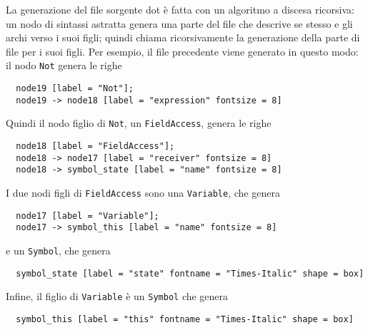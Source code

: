 La generazione del file sorgente dot \`e fatta con un algoritmo
a discesa ricorsiva:
un nodo di sintassi astratta genera una parte del file
che descrive se stesso e gli archi verso i suoi figli; quindi chiama
ricorsivamente la generazione della parte di file per i suoi figli.
Per esempio, il file precedente viene generato in questo modo:
il nodo \texttt{Not} genera le righe
%
\begin{verbatim}
  node19 [label = "Not"];
  node19 -> node18 [label = "expression" fontsize = 8]
\end{verbatim}
%
Quindi il nodo figlio di \texttt{Not}, \cioe un \texttt{FieldAccess},
genera le righe
%
\begin{verbatim}
  node18 [label = "FieldAccess"];
  node18 -> node17 [label = "receiver" fontsize = 8]
  node18 -> symbol_state [label = "name" fontsize = 8]
\end{verbatim}
%
I due nodi figli di \texttt{FieldAccess} sono una \texttt{Variable}, che
genera
%
\begin{verbatim}
  node17 [label = "Variable"];
  node17 -> symbol_this [label = "name" fontsize = 8]
\end{verbatim}
%
e un \texttt{Symbol}, che genera
%
\begin{verbatim}
  symbol_state [label = "state" fontname = "Times-Italic" shape = box]
\end{verbatim}
%
Infine, il figlio di \texttt{Variable} \`e un \texttt{Symbol} che genera
%
\begin{verbatim}
  symbol_this [label = "this" fontname = "Times-Italic" shape = box]
\end{verbatim}

